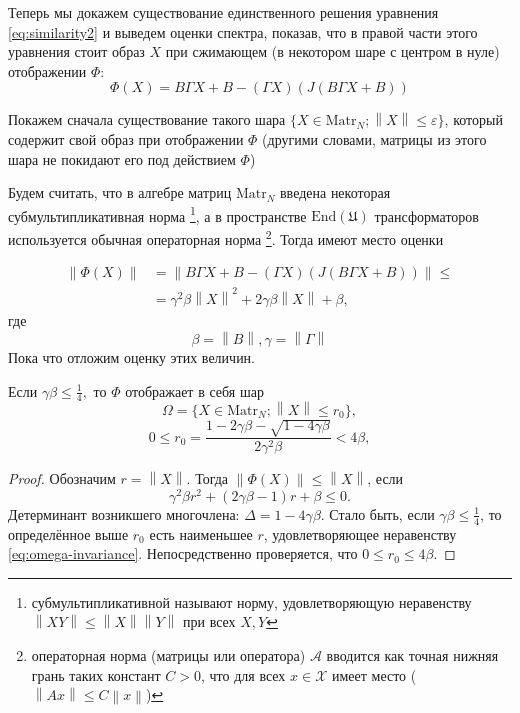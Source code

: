Теперь мы докажем существование единственного решения уравнения \eqref{eq:similarity2}
и выведем оценки спектра,
показав, что в правой части этого уравнения стоит образ \( X \)
при сжимающем (в некотором шаре с центром в нуле) отображении \( \Phi \):
\[ \Phi(X) = B \Gamma X + B - (\Gamma X) (J(B\Gamma X + B)) \]

Покажем сначала существование такого шара \( \{ X\in\mathrm{Matr}_{N}; {\left\|X\right\|} \leq \varepsilon \} \),
который содержит свой образ при отображении \( \Phi \)
(другими словами, матрицы из этого шара
 не покидают его под действием \( \Phi \))

Будем считать, что в алгебре матриц \( \mathrm{Matr}_{N} \)
введена некоторая субмультипликативная норма%
\footnote{субмультипликативной называют норму, удовлетворяющую неравенству \( {\left\|XY\right\|}\leq {\left\|X\right\|}{\left\|Y\right\|} \) при всех \( X, Y \) },
а в пространстве \( \mathrm{End}\left({\mathfrak U}\right) \) трансформаторов
используется обычная операторная норма%
\footnote{операторная норма
(матрицы или оператора) \( \mathcal A \)
вводится как точная нижняя грань таких констант \( C > 0 \),
что для всех \( x\in\mathscr X\) имеет место
(\( {\left\|A x\right\|} \leq C {\left\|x\right\|} \))}.
Тогда имеют место оценки

\begin{align*}
    {\left\|\Phi(X)\right\|} &= {\left\|B \Gamma X + B - (\Gamma X) (J(B\Gamma X + B))\right\|} \leq \\
    &= \gamma^2\beta{\left\|X\right\|}^2 + 2\gamma\beta{\left\|X\right\|} + \beta,
\end{align*}
где \[ \beta={\left\|B\right\|}, \gamma={\left\|\Gamma\right\|} \]
Пока что отложим оценку этих величин.

\begin{lemma}
    Если
    \( \gamma\beta \leq \frac14, \)
    то \( \Phi \) отображает в себя шар
    \begin{equation}\label{def:omega}
        \Omega = \{ X\in\mathrm{Matr}_{N} ; {\left\|X\right\|}\leq r_0 \},
    \end{equation}
    \[0 \leq r_0 = \frac{1 - 2\gamma\beta - \sqrt{1-4\gamma\beta}}{2\gamma^2\beta} < 4\beta, \]
\end{lemma}
\begin{proof}
    Обозначим \( r={\left\|X\right\|} \). Тогда
    \( {\left\|\Phi(X)\right\|} \leq {\left\|X\right\|} \), если
    \begin{equation}\label{eq:omega-invariance}
        \gamma^2\beta r^2 + (2\gamma\beta - 1) r + \beta \leq 0.
    \end{equation}
    Детерминант возникшего многочлена:
    \( \Delta = 1 - 4\gamma\beta\).\-
    Стало быть, если \( {\gamma\beta \leq \frac14} \),
    то определённое выше \( r_0 \) есть наименьшее \( r \),
    удовлетворяющее неравенству \eqref{eq:omega-invariance}.
    Непосредственно проверяется, что \( 0 \leq  r_0 \leq 4\beta \).
\end{proof}

